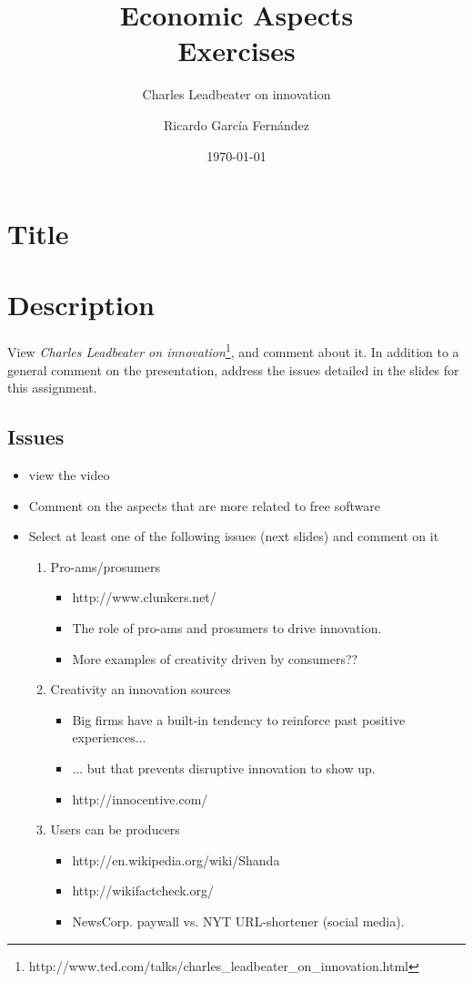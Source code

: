 \documentclass[11pt]{scrartcl}
\title{\textbf{Economic Aspects\\
                Exercises}}
\subtitle{Charles Leadbeater on innovation}
\author{Ricardo Garc\'ia Fern\'andez}
\date{\today}
\begin{document}
\maketitle

\section{Title}

\section{Description}

View \emph{Charles Leadbeater on innovation}\footnote{http://www.ted.com/talks/charles\_leadbeater\_on\_innovation.html}, and comment about it. In addition to a general comment on the presentation, address the issues detailed in the slides for this assignment.

\subsection{Issues}

\begin{itemize}
	\item view the video
    \item Comment on the aspects that are more related to free software
    \item Select at least one of the following issues (next slides) and comment on it
    \begin{enumerate}
	    \item Pro-ams/prosumers
	    \begin{itemize}
        	\item http://www.clunkers.net/
        	\item The role of pro-ams and prosumers to drive innovation.
        	\item More examples of creativity driven by consumers??
        \end{itemize}
        \item Creativity an innovation sources
        \begin{itemize}
	        \item Big firms have a built-in tendency to reinforce past positive experiences...
	        \item ... but that prevents disruptive innovation to show up.
	        \item http://innocentive.com/
        \end{itemize}
        \item Users can be producers
        \begin{itemize}
	        \item http://en.wikipedia.org/wiki/Shanda
	        \item http://wikifactcheck.org/
	        \item NewsCorp. paywall vs. NYT URL-shortener (social media).
        \end{itemize}
    \end{enumerate}
\end{itemize}
\end{document}
